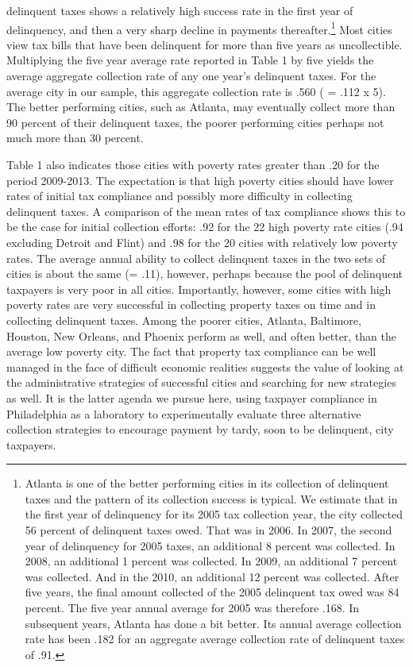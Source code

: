 \documentclass[12pt,titlepage]{article}
\begin{document}
delinquent taxes shows a relatively high success rate in the first
year of delinquency, and then a very sharp decline in payments
thereafter.\footnote{Atlanta is one of the better performing cities in
  its collection of delinquent taxes and the pattern of its collection
  success is typical.  We estimate that in the first year of
  delinquency for its 2005 tax collection year, the city collected 56
  percent of delinquent taxes owed. That was in 2006.  In 2007, the
  second year of delinquency for 2005 taxes, an additional 8 percent
  was collected.  In 2008, an additional 1 percent was collected.  In
  2009, an additional 7 percent was collected.  And in the 2010, an
  additional 12 percent was collected.  After five years, the final
  amount collected of the 2005 delinquent tax owed was 84 percent.
  The five year annual average for 2005 was therefore .168.  In
  subsequent years, Atlanta has done a bit better.  Its annual average
  collection rate has been .182 for an aggregate average collection
  rate of delinquent taxes of .91.} Most cities view tax bills that
have been delinquent for more than five years as uncollectible.
Multiplying the five year average rate reported in Table 1 by five
yields the average aggregate collection rate of any one year's
delinquent taxes.  For the average city in our sample, this aggregate
collection rate is .560 ( = .112 x 5).  The better performing cities,
such as Atlanta, may eventually collect more than 90 percent of their
delinquent taxes, the poorer performing cities perhaps not much more
than 30 percent.

Table 1 also indicates those cities with poverty rates greater than
.20 for the period 2009-2013.  The expectation is that high poverty
cities should have lower rates of initial tax compliance and possibly
more difficulty in collecting delinquent taxes.  A comparison of the
mean rates of tax compliance shows this to be the case for initial
collection efforts: .92 for the 22 high poverty rate cities (.94
excluding Detroit and Flint) and .98 for the 20 cities with relatively
low poverty rates.  The average annual ability to collect delinquent
taxes in the two sets of cities is about the same (= .11), however,
perhaps because the pool of delinquent taxpayers is very poor in all
cities.  Importantly, however, some cities with high poverty rates are
very successful in collecting property taxes on time and in collecting
delinquent taxes.  Among the poorer cities, Atlanta, Baltimore,
Houston, New Orleans, and Phoenix perform as well, and often better,
than the average low poverty city.  The fact that property tax
compliance can be well managed in the face of difficult economic
realities suggests the value of looking at the administrative
strategies of successful cities and searching for new strategies as
well.  It is the latter agenda we pursue here, using taxpayer
compliance in Philadelphia as a laboratory to experimentally evaluate
three alternative collection strategies to encourage payment by tardy,
soon to be delinquent, city taxpayers.
\end{document}

